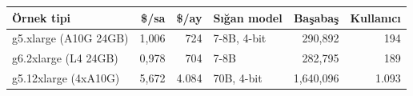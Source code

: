 \begin{tabular}{@{}lrrlrr@{}}
\toprule
\textbf{Örnek tipi} & \textbf{\$/sa} & \textbf{\$/ay} & \textbf{Sığan model} & \textbf{Başabaş} & \textbf{Kullanıcı} \\
\midrule
g5.xlarge (A10G 24GB) & 1,006 & 724 & 7-8B, 4-bit & 290,892 & 194 \\
g6.2xlarge (L4 24GB) & 0,978 & 704 & 7-8B & 282,795 & 189 \\
g5.12xlarge (4xA10G) & 5,672 & 4.084 & 70B, 4-bit & 1,640,096 & 1.093 \\
\bottomrule
\end{tabular}
